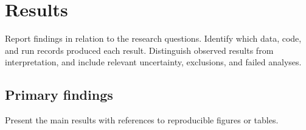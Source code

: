 \chapter{Results}

Report findings in relation to the research questions. Identify which data, code, and run records produced each result. Distinguish observed results from interpretation, and include relevant uncertainty, exclusions, and failed analyses.

\section{Primary findings}

Present the main results with references to reproducible figures or tables.
